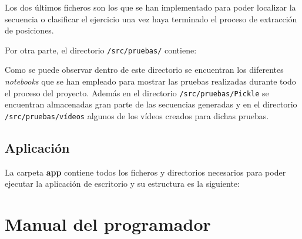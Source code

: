 Los dos últimos ficheros son los que se han implementado para poder localizar la secuencia o clasificar el ejercicio una vez haya terminado el proceso de extracción de posiciones.

Por otra parte, el directorio \texttt{/src/pruebas/} contiene:

Como se puede observar dentro de este directorio se encuentran los diferentes \textit{notebooks} que se han empleado para mostrar las pruebas realizadas durante todo el proceso del proyecto. Además en el directorio \texttt{/src/pruebas/Pickle} se encuentran almacenadas gran parte de las secuencias generadas y en el directorio \texttt{/src/pruebas/vídeos} algunos de los vídeos creados para dichas pruebas. 


\subsection{Aplicación}
La carpeta \textbf{app} contiene todos los ficheros y directorios necesarios para poder ejecutar la aplicación de escritorio y su estructura es la siguiente:

\section{Manual del programador}

